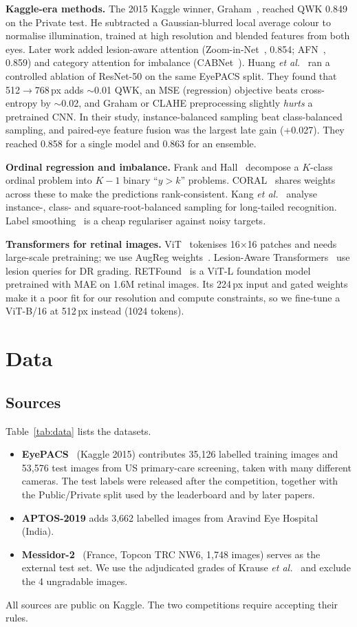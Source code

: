 \documentclass[conference,a4paper]{IEEEtran}
\begin{document}
\textbf{Kaggle-era methods.}
The 2015 Kaggle winner, Graham~\cite{graham}, reached QWK 0.849 on the Private test. He subtracted a Gaussian-blurred local average colour to normalise illumination, trained at high resolution and blended features from both eyes.
Later work added lesion-aware attention (Zoom-in-Net~\cite{zoomin}, 0.854; AFN~\cite{afn}, 0.859) and category attention for imbalance (CABNet~\cite{cabnet}).
Huang \emph{et al.}~\cite{huang} ran a controlled ablation of ResNet-50 on the same EyePACS split. They found that 512$\rightarrow$768\,px adds $\sim$0.01 QWK, an MSE (regression) objective beats cross-entropy by $\sim$0.02, and Graham or CLAHE preprocessing slightly \emph{hurts} a pretrained CNN.
In their study, instance-balanced sampling beat class-balanced sampling, and paired-eye feature fusion was the largest late gain (+0.027). They reached 0.858 for a single model and 0.863 for an ensemble.

\textbf{Ordinal regression and imbalance.}
Frank and Hall~\cite{frankhall} decompose a $K$-class ordinal problem into $K-1$ binary ``$y>k$'' problems. CORAL~\cite{coral} shares weights across these to make the predictions rank-consistent.
Kang \emph{et al.}~\cite{kang} analyse instance-, class- and square-root-balanced sampling for long-tailed recognition. Label smoothing~\cite{smoothing} is a cheap regulariser against noisy targets.

\textbf{Transformers for retinal images.}
ViT~\cite{vit} tokenises 16$\times$16 patches and needs large-scale pretraining; we use AugReg weights~\cite{augreg}.
Lesion-Aware Transformers~\cite{lat} use lesion queries for DR grading. RETFound~\cite{retfound} is a ViT-L foundation model pretrained with MAE on 1.6M retinal images.
Its 224\,px input and gated weights make it a poor fit for our resolution and compute constraints, so we fine-tune a ViT-B/16 at 512\,px instead (1024 tokens).

\section{Data}
\subsection{Sources}
Table~\ref{tab:data} lists the datasets.
\begin{itemize}
\item \textbf{EyePACS}~\cite{eyepacs} (Kaggle 2015) contributes 35,126 labelled training images and 53,576 test images from US primary-care screening, taken with many different cameras. The test labels were released after the competition, together with the Public/Private split used by the leaderboard and by later papers.
\item \textbf{APTOS-2019} adds 3,662 labelled images from Aravind Eye Hospital (India).
\item \textbf{Messidor-2}~\cite{messidor} (France, Topcon TRC NW6, 1,748 images) serves as the external test set. We use the adjudicated grades of Krause \emph{et al.}~\cite{krause} and exclude the 4 ungradable images.
\end{itemize}
All sources are public on Kaggle. The two competitions require accepting their rules.
\end{document}
